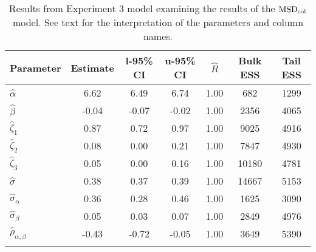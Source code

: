 \begin{table}

\caption{Results from Experiment 3 model examining the results of the $\operatorname{MSD}_{\text{col}}$ model. \label{tab:Experiment 3-MSDobs}See text for the interpretation of the parameters and column names.}

\begin{tabular}{l *3{S[table-format=-1.2]} S[table-format=1.2] *2{S[table-format=5.0]}}
\lsptoprule
Parameter & {Estimate} & {l-95\% CI} & {u-95\% CI} & {$\hat{R}$} & {Bulk ESS} & {Tail ESS}\\
\midrule
$\hat\alpha$ & 6.62 & 6.49 & 6.74 & 1.00 & 682 & 1299\\
$\hat\beta$ & -0.04 & -0.07 & -0.02 & 1.00 & 2356 & 4065\\
$\hat\zeta_{1}$ & 0.87 & 0.72 & 0.97 & 1.00 & 9025 & 4916\\
$\hat\zeta_{2}$ & 0.08 & 0.00 & 0.21 & 1.00 & 7847 & 4930\\
$\hat\zeta_{3}$ & 0.05 & 0.00 & 0.16 & 1.00 & 10180 & 4781\\
$\hat\sigma$ & 0.38 & 0.37 & 0.39 & 1.00 & 14667 & 5153\\
$\hat\sigma_{\alpha}$ & 0.36 & 0.28 & 0.46 & 1.00 & 1625 & 3090\\
$\hat\sigma_{\beta}$ & 0.05 & 0.03 & 0.07 & 1.00 & 2849 & 4976\\
$\hat\rho_{\alpha,\beta}$ & -0.43 & -0.72 & -0.05 & 1.00 & 3649 & 5390\\
\lspbottomrule
\end{tabular}

\end{table}






